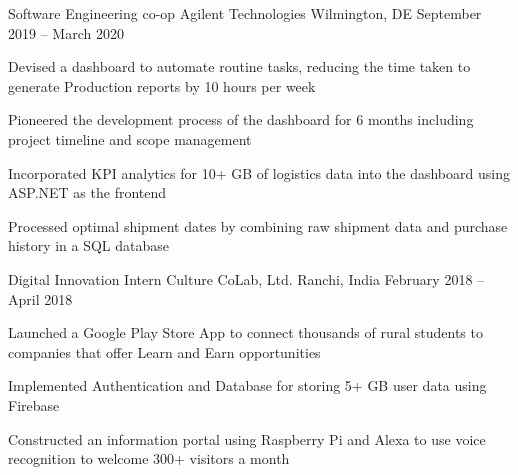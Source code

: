\begin{cventries}
	\vspace{-2mm}
	\cventry
	{Software Engineering co-op}
	{Agilent Technologies}
	{Wilmington, DE}
	{September 2019 – March 2020}
	{\begin{cvitems}
	    \item {Devised a dashboard to automate routine tasks, reducing the time taken to generate Production reports by 10 hours per week}
        \item {Pioneered the development process of the dashboard for 6 months including project timeline and scope management}
		\item {Incorporated KPI analytics for 10+ GB of logistics data into the dashboard using ASP.NET as the frontend}
        \item {Processed optimal shipment dates by combining raw shipment data and purchase history in a SQL database}
		\end{cvitems}}
	
	
	\vspace{-2mm}
	\cventry
	{Digital Innovation Intern}
	{Culture CoLab, Ltd.}
	{Ranchi, India}
	{February 2018 – April 2018}
	{\begin{cvitems}
		\item {Launched a Google Play Store App to connect thousands of rural students to companies that offer Learn and Earn opportunities}
		\item {Implemented Authentication and Database for storing 5+ GB user data using Firebase}
		\item {Constructed an information portal using Raspberry Pi and Alexa to use voice recognition to welcome 300+ visitors a month}
		\end{cvitems}}

\end{cventries}
